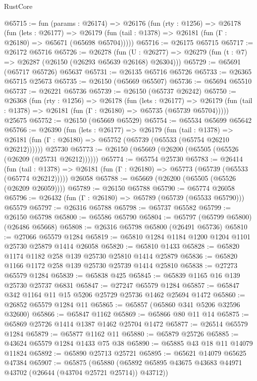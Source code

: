 \begin{lexlean}{RustCore}
\begin{coremodule}
@65715 := fun (params : @26174) =>
  @26176
    (fun (rty : @1256) =>
    @26178
      (fun (lets : @26177) =>
      @26179 (fun (tail : @1378) => @26181 (fun (Γ : @26180) => @65671 (@65698 @65704)))))
@65716 := @26175 @65715
@65717 := @26172 @65716
@65726 := @26278
    (fun (U : @26277) => @26279 (fun (t : @7) => @26287 (@26150 (@26293 @65639 @26168) @26304)))
@65729 := @65691 (@65717 @65726) @65637
@65731 := @26135 @65716 @65726
@65733 := @26365 @65715 @25673
@65735 := @26150 (@65669 @65507)
@65736 := @65694 @65510
@65737 := @26221 @65736
@65739 := @26150 (@65737 @26242)
@65750 := @26368
    (fun (rty : @1256) =>
    @26178
      (fun (lets : @26177) =>
      @26179 (fun (tail : @1378) => @26181 (fun (Γ : @26180) => @65735 (@65739 @65704)))))
    @25675
@65752 := @26150 (@65669 @65529)
@65754 := @65534 @65699 @65642
@65766 := @26390
    (fun (lets : @26177) =>
    @26179
      (fun (tail : @1378) =>
      @26181 (fun (Γ : @26180) => @65752 (@65739 (@65533 (@65754 @26210 @26212))))))
    @25730
@65773 := @26150 (@65669 (@26200 (@65505 (@65526 (@26209 (@25731 @26212))))))
@65774 := @65754 @25730
@65783 := @26414
    (fun (tail : @1378) => @26181 (fun (Γ : @26180) => @65773 (@65739 (@65533 (@65774 @26212)))))
    @26058
@65788 := @65669 (@26200 (@65505 (@65526 (@26209 @26059))))
@65789 := @26150 @65788
@65790 := @65774 @26058
@65796 := @26432 (fun (Γ : @26180) => @65789 (@65739 (@65533 @65790))) @65579
@65797 := @26316 @65788
@65798 := @65737 @65582
@65799 := @26150 @65798
@65800 := @65586 @65790
@65804 := @65797 (@65799 @65800) (@26486 @65668)
@65808 := @26316 @65798 @65800 (@26491 @65736)
@65810 := @27066 @65579 @1284
@65819 := @65810 @1284 @1184 @1200 @1204 @1101 @25730 @25879 @1414 @26058
@65820 := @65810 @1433
@65828 := @65820 @1174 @1182 @258 @139 @25730 @25810 @1414 @25879
@65836 := @65820 @1166 @1172 @258 @139 @25730 @25739 @1414 @25810
@65838 := @27273 @65579 @1284
@65839 := @65838 @425
@65845 := @65839 @1165 @16 @139 @25730 @25737 @6831
@65847 := @27247 @65579 @1284
@65857 := @65847 @342 @1164 @11 @15 @5206 @25729 @25736 @1462 @25694 @1472
@65860 := @26852 @65579 @1284 @11
@65865 := @65857 (@65860 @341 @5206 @32596 @32600)
@65866 := @65847 @1162
@65869 := @65866 @80 @11 @14
@65875 := @65869 @25726 @1414 @1387 @1462 @25704 @1472
@65877 := @26514 @65579 @1284
@65879 := @65877 @1162 @11
@65880 := @65879 @25726
@65885 := @43624 @65579 @1284 @1433 @75 @38
@65890 := @65885 @43 @18 @11 @14079 @11824
@65892 := @65890 @25713 @25721
@65895 := @65621 @14079 @65625 @47384
@65907 := @65875
    (@65880 (@65892 @65895 @43675 @43683 @44971 @43702 (@26644 (@43704 @25721 @25714)) @43712))

\end{coremodule}
\end{lexlean}
